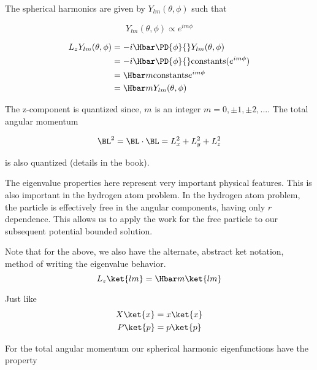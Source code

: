 The spherical harmonics are given by \(Y_{lm}(\theta, \phi)\) such that

\begin{equation}\label{eqn:PHY356Foct19:1004}
Y_{lm}(\theta, \phi) \propto e^{i m \phi}
\end{equation}

\begin{equation}\label{eqn:lecture6OrbitalandIntrinsicMomentum:2080}
\begin{aligned}
L_z Y_{lm}(\theta, \phi)
&= -i \Hbar \PD{\phi}{} Y_{lm}(\theta, \phi) \\
&= -i \Hbar \PD{\phi}{} \text{constants} (e^{im \phi}) \\
&= \Hbar m \text{constants} e^{i m \phi} \\
&= \Hbar m Y_{lm}(\theta, \phi)
\end{aligned}
\end{equation}

The z-component is quantized since, \(m\) is an integer \(m = 0, \pm 1, \pm 2, ...\).  The total angular momentum

\begin{equation}\label{eqn:PHY356Foct19:1005}
\BL^2 = \BL \cdot \BL = L_x^2 + L_y^2 + L_z^2
\end{equation}

is also quantized (details in the book).

The eigenvalue properties here represent very important physical features.  This is also important in the hydrogen atom problem.  In the hydrogen atom problem, the particle is effectively free in the angular components, having only \(r\) dependence.  This allows us to apply the work for the free particle to our subsequent potential bounded solution.

Note that for the above, we also have the alternate, abstract ket notation, method of writing the eigenvalue behavior.
\begin{equation}\label{eqn:PHY356Foct19:1006}
L_z \ket{lm} = \Hbar m \ket{lm}
\end{equation}

Just like
\begin{equation}\label{eqn:PHY356Foct19:1007}
\begin{aligned}
X \ket{x} &= x \ket{x} \\
P \ket{p} &= p \ket{p}
\end{aligned}
\end{equation}

For the total angular momentum our spherical harmonic eigenfunctions have the property

